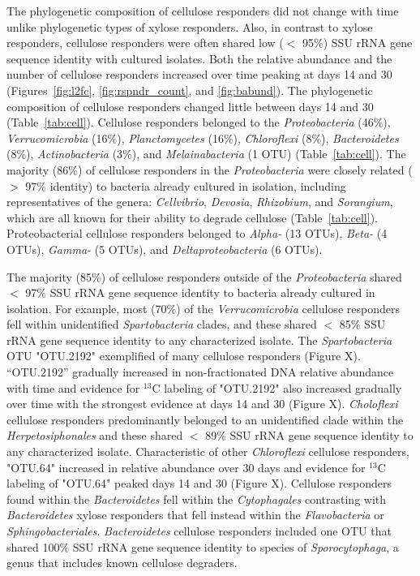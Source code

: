 The phylogenetic composition of cellulose responders did not change with time
unlike phylogenetic types of xylose responders. Also, in contrast to xylose
responders, cellulose responders were often shared low ($<$ 95\%) SSU rRNA gene
sequence identity with cultured isolates. Both the relative abundance and the
number of cellulose responders increased over time peaking at days 14 and 30
(Figures~\ref{fig:l2fc}, \ref{fig:rspndr_count}, and \ref{fig:babund}). The
phylogenetic composition of cellulose responders changed little between days
14 and 30 (Table~\ref{tab:cell}). Cellulose responders belonged to the
\textit{Proteobacteria} (46\%), \textit{Verrucomicrobia} (16\%),
\textit{Planctomycetes} (16\%), \textit{Chloroflexi} (8\%),
\textit{Bacteroidetes} (8\%), \textit{Actinobacteria} (3\%), and
\textit{Melainabacteria} (1 OTU) (Table~\ref{tab:cell}). The majority (86\%)
of cellulose responders in the \textit{Proteobacteria} were closely related
($>$ 97\% identity) to bacteria already cultured in isolation, including
representatives of the genera: \textit{Cellvibrio}, \textit{Devosia},
\textit{Rhizobium}, and \textit{Sorangium}, which are all known for their
ability to degrade cellulose (Table~\ref{tab:cell}). Proteobacterial cellulose
responders belonged to \textit{Alpha-} (13 OTUs), \textit{Beta-} (4 OTUs),
\textit{Gamma-} (5 OTUs), and \textit{Deltaproteobacteria} (6 OTUs). 

The majority (85\%) of cellulose responders outside of the
\textit{Proteobacteria} shared  $<$ 97\% SSU rRNA gene sequence identity to
bacteria already cultured in isolation. For example, most (70\%) of the
\textit{Verrucomicrobia} cellulose responders fell within unidentified
\textit{Spartobacteria} clades, and these shared $<$ 85\% SSU rRNA gene
sequence identity to any characterized isolate. The \textit{Spartobacteria} OTU
"OTU.2192" exemplified of many cellulose responders (Figure X). ``OTU.2192''
gradually increased in non-fractionated DNA relative abundance with time
and evidence for $^{13}$C labeling of "OTU.2192" also increased gradually over
time with the strongest evidence at days 14 and
30 (Figure X). \textit{Choloflexi} cellulose responders predominantly belonged
to an unidentified clade within the \textit{Herpetosiphonales} and these
shared $<$ 89\% SSU rRNA gene sequence identity to any characterized
isolate. Characteristic of other \textit{Chloroflexi} cellulose responders,
"OTU.64" increased in relative abundance over 30 days and evidence for
$^{13}$C labeling of "OTU.64" peaked days 14 and 30 (Figure X). Cellulose
responders found within the \textit{Bacteroidetes} fell within the
\textit{Cytophagales} contrasting with \textit{Bacteroidetes} xylose
responders that fell instead within the \textit{Flavobacteria} or
\textit{Sphingobacteriales}. \textit{Bacteroidetes} cellulose responders
included one OTU that shared 100\% SSU rRNA gene sequence identity to
species of \textit{Sporocytophaga}, a genus that includes known cellulose
degraders.

